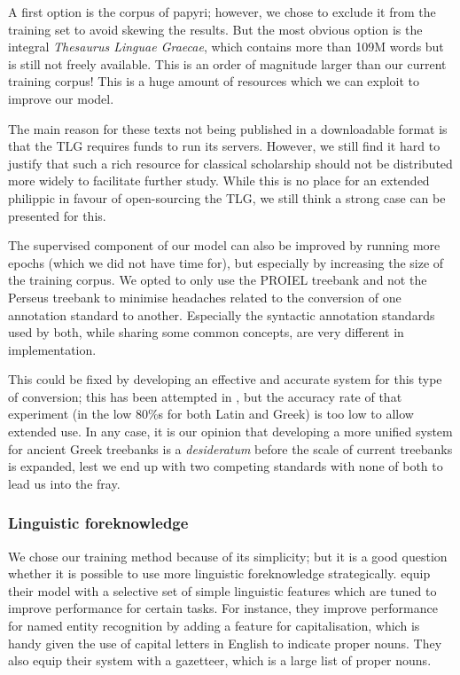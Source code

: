 A first option is the corpus of papyri; however, we chose to exclude
it from the training set to avoid skewing the results. But the most
obvious option is the integral \textit{Thesaurus Linguae Graecae},
which contains more than 109M words but is still not freely
available. This is an order of magnitude larger than our current
training corpus! This is a huge amount of resources which we can
exploit to improve our model.

The main reason for these texts not being published in a downloadable
format is that the TLG requires funds to run its servers. However, we
still find it hard to justify that such a rich resource for classical
scholarship should not be distributed more widely to facilitate
further study. While this is no place for an extended philippic in
favour of open-sourcing the TLG, we still think a strong case can be
presented for this.

The supervised component of our model can also be improved by running
more epochs (which we did not have time for), but especially by
increasing the size of the training corpus. We opted to only use the
PROIEL treebank and not the Perseus treebank to minimise headaches
related to the conversion of one annotation standard to
another. Especially the syntactic annotation standards used by both,
while sharing some common concepts, are very different in
implementation.

This could be fixed by developing an effective and accurate system for
this type of conversion; this has been attempted in
\cite{conf/lrec/LeeH10}, but the accuracy rate of that experiment (in
the low 80\%s for both Latin and Greek) is too low to allow extended
use. In any case, it is our opinion that developing a more unified
system for ancient Greek treebanks is a \textit{desideratum} before
the scale of current treebanks is expanded, lest we end up with two
competing standards with none of both to lead us into the fray.

\subsubsection{Linguistic foreknowledge}
We chose our training method because of its simplicity; but it is a
good question whether it is possible to use more linguistic
foreknowledge strategically. \cite{collobert-2011} equip their model
with a selective set of simple linguistic features which are tuned to
improve performance for certain tasks. For instance, they improve
performance for named entity recognition by adding a feature for
capitalisation, which is handy given the use of capital letters in
English to indicate proper nouns. They also equip their system with a
gazetteer, which is a large list of proper nouns.

